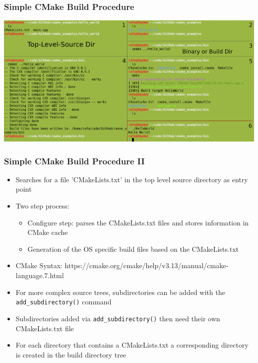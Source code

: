 \begin{frame}
  \frametitle{Simple CMake Build Procedure}
  \begin{center}
    \includegraphics[width=\textwidth]{img/cmake-command-line.png}
  \end{center}
\end{frame}

\begin{frame}
  \frametitle{Simple CMake Build Procedure II}

    \begin{itemize}
      \item Searches for a file 'CMakeLists.txt' in the top level source directory as entry point 
      \item Two step process: 
      \begin{itemize}
        \item Configure step: parses the CMakeLists.txt files and stores information in CMake cache
        \item Generation of the OS specific build files based on the CMakeLists.txt
      \end{itemize}
      \item CMake Syntax: https://cmake.org/cmake/help/v3.13/manual/cmake-language.7.html
      \item For more complex source trees, subdirectories can be added with the \texttt{add\_subdirectory()} command
      \item Subdirectories added via \texttt{add\_subdirectory()} then need their own CMakeLists.txt file
      \item For each directory that contains a CMakeLists.txt a corresponding directory is created in the build directory tree
    \end{itemize}

\end{frame}

